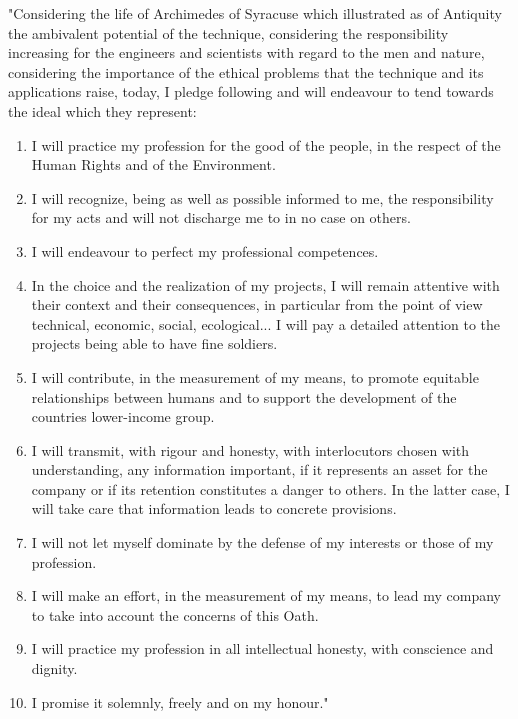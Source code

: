 	"Considering the life of Archimedes of Syracuse which illustrated as of Antiquity the ambivalent potential of the technique, considering the responsibility increasing for the engineers and scientists with regard to the men and nature, considering the importance of the ethical problems that the technique and its applications raise, today, I pledge following and will endeavour to tend towards the ideal which they represent:
	\begin{enumerate}[label=\protect\circledbullet{\arabic*},leftmargin=15mm]
		\item I will practice my profession for the good of the people, in the respect of the Human Rights and of the Environment.

		\item I will recognize, being as well as possible informed to me, the responsibility for my acts and will not discharge me to in no case on others.

		\item I will endeavour to perfect my professional competences.

		\item In the choice and the realization of my projects, I will remain attentive with their context and their consequences, in particular from the point of view technical, economic, social, ecological... I will pay a detailed attention to the projects being able to have fine soldiers.

		\item I will contribute, in the measurement of my means, to promote equitable relationships between humans and to support the development of the countries lower-income group.

		\item I will transmit, with rigour and honesty, with interlocutors chosen with understanding, any information important, if it represents an asset for the company or if its retention constitutes a danger to others. In the latter case, I will take care that information leads to concrete provisions.

		\item I will not let myself dominate by the defense of my interests or those of my profession.

		\item I will make an effort, in the measurement of my means, to lead my company to take into account the concerns of this Oath.

		\item I will practice my profession in all intellectual honesty, with conscience and dignity.

		\item I promise it solemnly, freely and on my honour."
\end{enumerate}
